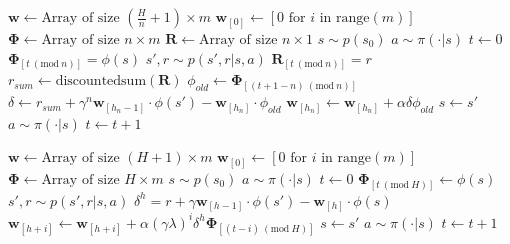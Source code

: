 \begin{appendices}

\begin{algorithm}[H]\small
\caption{\small Linear $n$-step FHTD for estimating $V^H \approx v^H_\pi$}
\label{alg:nstepfhtd}
\begin{algorithmic}
\State $\textbf{w} \leftarrow \textrm{Array of size } (\frac{H}{n} + 1) \times m$%
\State $\textbf{w}_{[0]} \leftarrow [0 \textrm{ for } i \textrm{ in } \textrm{range}(m)]$
\State $\bm{\Phi} \leftarrow \textrm{Array of size } n \times m$
\State $\textbf{R} \leftarrow \textrm{Array of size } n \times 1$
\State $s \sim p(s_0)$
\State $a \sim \pi(\cdot|s)$
\State $t \leftarrow 0$
    \State $\bm{\Phi}_{[t \ (\mathrm{mod}\ n)]} = \phi(s)$
    \State $s', r \sim p(s', r|s, a)$
    \State $\textbf{R}_{[t \ (\mathrm{mod}\ n)]} = r$
        \State $r_{sum} \leftarrow \textrm{discountedsum}(\textbf{R})$
        \State $\phi_{old} \leftarrow \bm{\Phi}_{[(t + 1 - n) \ (\mathrm{mod}\ n)]}$
            \State $\delta \leftarrow r_{sum} + \gamma^n \textbf{w}_{[h_{n} - 1]} \cdot \phi(s') - \textbf{w}_{[h_{n}]} \cdot \phi_{old}$
            \State $\textbf{w}_{[h_{n}]} \leftarrow \textbf{w}_{[h_{n}]} + \alpha \delta \phi_{old}$
        \EndFor
    \EndIf
    \State $s \leftarrow s'$
    \State $a \sim \pi(\cdot|s)$
    \State $t \leftarrow t + 1$
\EndWhile
\end{algorithmic}
\end{algorithm}


\begin{algorithm}[H]\small
\caption{\small Linear FHTD($\lambda$) for estimating $V^H \approx v^H_\pi$}
\label{alg:fhtdlambda}
\begin{algorithmic}
\State $\textbf{w} \leftarrow \textrm{Array of size } (H + 1) \times m$
\State $\textbf{w}_{[0]} \leftarrow [0 \textrm{ for } i \textrm{ in } \textrm{range}(m)]$
\State $\bm{\Phi} \leftarrow \textrm{Array of size } H \times m$
\State $s \sim p(s_0)$
\State $a \sim \pi(\cdot|s)$
\State $t \leftarrow 0$
    \State $\bm{\Phi}_{[t \ (\mathrm{mod}\ H)]} \leftarrow \phi(s)$
    \State $s', r \sim p(s', r|s, a)$
        \State $\delta^h = r + \gamma \textbf{w}_{[h-1]} \cdot \phi(s') -  \textbf{w}_{[h]} \cdot \phi(s)$
            \State $\textbf{w}_{[h+i]} \leftarrow \textbf{w}_{[h+i]} + \alpha (\gamma\lambda)^i \delta^h \bm{\Phi}_{[(t - i) \ (\mathrm{mod}\ H)]}$
        \EndFor
    \EndFor
    \State $s \leftarrow s'$
    \State $a \sim \pi(\cdot | s)$
    \State $t \leftarrow t + 1$
\EndWhile


\end{algorithmic}
\end{algorithm}
\end{appendices}
